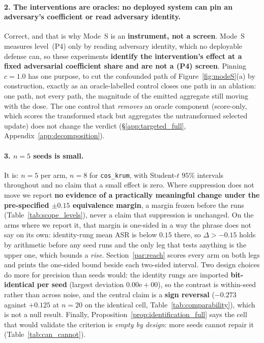 \documentclass{article}
\begin{document}
\paragraph{2. The interventions are oracles: no deployed system can pin an adversary's coefficient or
read adversary identity.} Correct, and that is why Mode~S is an \textbf{instrument, not a screen}. Mode~S
measures level~(P4) only by reading adversary identity, which no deployable defense can, so these
experiments \textbf{identify the intervention's effect at a fixed adversarial coefficient share and are
not a (P4) screen}. Pinning $c{=}1.0$ has one purpose, to cut the confounded path of
Figure~\ref{fig:modeS}(a) by construction, exactly as an oracle-labelled control closes one path in an
ablation: one path, not every path, the magnitude of the emitted aggregate still moving with the dose. The one control that \emph{removes} an oracle
component (score-only, which scores the transformed stack but aggregates the untransformed selected
update) does not change the verdict (§\ref{app:targeted_full}, Appendix~\ref{app:decomposition}).

\paragraph{3. $n{=}5$ seeds is small.} It is: $n{=}5$ per arm, $n{=}8$ for \texttt{cos\_krum}, with
Student-$t$ $95\%$ intervals throughout and no claim that a small effect is zero. Where suppression does
not move we report \textbf{no evidence of a practically meaningful change under the pre-specified
$\pm0.15$ equivalence margin}, a margin frozen before the runs (Table~\ref{tab:scope_levels}), never a
claim that suppression is unchanged. On the arms where we report it, that margin is one-sided in a way the
phrase does not say on its own: identity-rung mean ASR is below $0.15$ there, so $\Delta > -0.15$ holds by
arithmetic before any seed runs and the only leg that tests anything is the upper one, which bounds a
\emph{rise}. Section~\ref{par:reach} scores every arm on both legs and prints the one-sided bound
beside each two-sided interval. Two design choices do more for precision than seeds would: the
identity rungs are imported \textbf{bit-identical per seed} (largest deviation $0.00\mathrm{e}{+}00$),
so the contrast is within-seed rather than across noise, and the central claim is a \textbf{sign
reversal} ($-0.273$ against $+0.125$ at $n{=}20$ on the identical cell, Table~\ref{tab:comparability}), which is not
a null result. Finally, Proposition~\ref{prop:identification_full} says the cell that would validate the
criterion is \emph{empty by design}: more seeds cannot repair it (Table~\ref{tab:can_cannot}).
\end{document}

